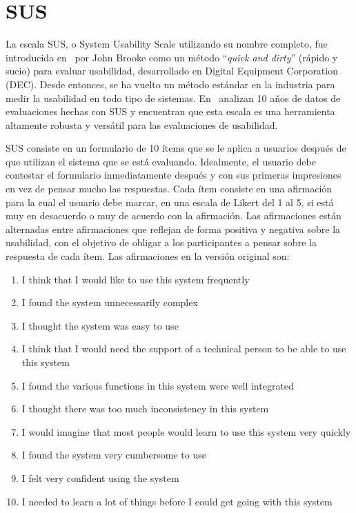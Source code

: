 \section{SUS}
\label{state-of-the-art:sus}

La escala SUS, o System Usability Scale utilizando su nombre completo, fue introducida en~\cite{brooke1996quick} por John Brooke como un método ``\textit{quick and dirty}'' (rápido y sucio) para evaluar usabilidad, desarrollado en Digital Equipment Corporation (DEC). Desde entonces, se ha vuelto un método estándar en la industria para medir la usabilidad en todo tipo de sistemas. En~\cite{evaluation-of-sus} analizan 10 años de datos de evaluaciones hechas con SUS y encuentran que esta escala es una herramienta altamente robusta y versátil para las evaluaciones de usabilidad.

SUS consiste en un formulario de 10 ítems que se le aplica a usuarios después de que utilizan el sistema que se está evaluando. Idealmente, el usuario debe contestar el formulario inmediatamente después y con sus primeras impresiones en vez de pensar mucho las respuestas. Cada ítem consiste en una afirmación para la cual el usuario debe marcar, en una escala de Likert del 1 al 5, si está muy en desacuerdo o muy de acuerdo con la afirmación. Las afirmaciones están alternadas entre afirmaciones que reflejan de forma positiva y negativa sobre la usabilidad, con el objetivo de obligar a los participantes a pensar sobre la respuesta de cada ítem. Las afirmaciones en la versión original son:
\begin{enumerate}
    \item I think that I would like to use this system frequently
    \item I found the system unnecessarily complex
    \item I thought the system was easy to use
    \item I think that I would need the support of a technical person to be able to use this system
    \item I found the various functions in this system were well integrated
    \item I thought there was too much inconsistency in this system
    \item I would imagine that most people would learn to use this system very quickly
    \item I found the system very cumbersome to use
    \item I felt very confident using the system
    \item I needed to learn a lot of things before I could get going with this system
\end{enumerate}

